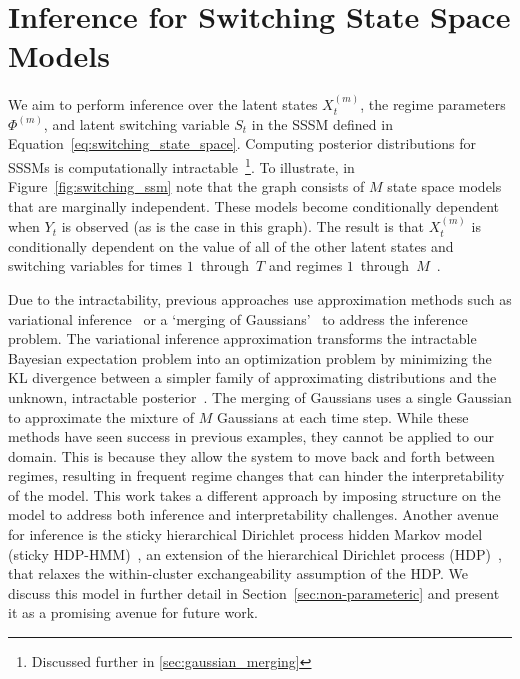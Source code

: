 \section{Inference for Switching State Space Models}\label{sec:inference_for_sssm}
We aim to perform inference over the latent states $X_t^{(m)}$, the regime parameters $\Phi^{(m)}$, and latent switching variable $S_t$ in the SSSM defined in Equation~\ref{eq:switching_state_space}. Computing posterior distributions for SSSMs is computationally intractable~\citep{murphy2002dynamic, kim1994dynamic}\footnote{Discussed further in \ref{sec:gaussian_merging}}. To illustrate, in Figure~\ref{fig:switching_ssm} note that the graph consists of $M$ state space models that are marginally independent. These models become conditionally dependent when $Y_t$ is observed (as is the case in this graph). The result is that $X_t^{(m)}$ is conditionally dependent on the value of all of the other latent states and switching variables for times $1$~through~$T$ and regimes $1$~through~$M$~\citep{murphy2002dynamic,ghahramani2000variational}.

Due to the intractability, previous approaches use approximation methods such as variational inference~\citep{ghahramani2000variational} or a `merging of Gaussians'~\citep{kim1999state,murphy2002dynamic} to address the inference problem. The variational inference approximation transforms the intractable Bayesian expectation problem into an optimization problem by minimizing the KL divergence between a simpler family of approximating distributions and the unknown, intractable posterior~\citep{attias2000variational,saul1996exploiting,saul1996mean,blei2003latent}. The merging of Gaussians uses a single Gaussian to approximate the mixture of $M$ Gaussians at each time step. While these methods have seen success in previous examples, they cannot be applied to our domain. This is because they allow the system to move back and forth between regimes, resulting in frequent regime changes that can hinder the interpretability of the model. This work takes a different approach by imposing structure on the model to address both inference and interpretability challenges. Another avenue for inference is the sticky hierarchical Dirichlet process hidden Markov model (sticky HDP-HMM)~\citep{fox2009nonparametric,fox2007hierarchical}, an extension of the hierarchical Dirichlet process (HDP)~\citep{teh2005sharing}, that relaxes the within-cluster exchangeability assumption of the HDP. We discuss this model in further detail in Section~\ref{sec:non-parameteric} and present it as a promising avenue for future work.

